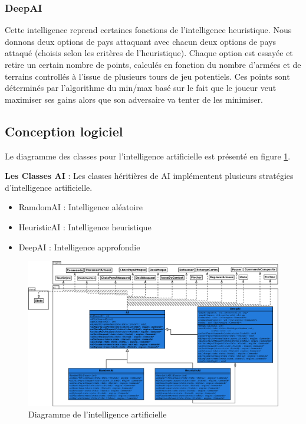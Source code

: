 \subsubsection{DeepAI}
Cette intelligence reprend certaines fonctions de l'intelligence heuristique. Nous donnons deux options de pays attaquant avec chacun deux options de pays attaqué (choisis selon les critères de l'heuristique). Chaque option est essayée et retire un certain nombre de points, calculés en fonction du nombre d'armées et de terrains controllés à l'issue de plusieurs tours de jeu potentiels. Ces points sont déterminés par l'algorithme du min/max basé sur le fait que le joueur veut maximiser ses gains alors que son adversaire va tenter de les minimiser. 
\newline

\subsection{Conception logiciel}
Le diagramme des classes pour l’intelligence artificielle est présenté en figure \ref{fig:ai}.

\textbf{Les Classes AI} : Les classes héritières de AI implémentent plusieurs stratégies d'intelligence artificielle.
\begin{itemize}
    \item RamdomAI : Intelligence aléatoire
    \item HeuristicAI : Intelligence heuristique
    \item DeepAI : Intelligence approfondie
\end{itemize}

\begin{landscape}
    \begin{figure}[!htbp]
        \centering
        \includegraphics[width=17cm]{Images/ai.png}
        \caption{Diagramme de l'intelligence artificielle}
        \label{fig:ai}
    \end{figure}
\end{landscape}

